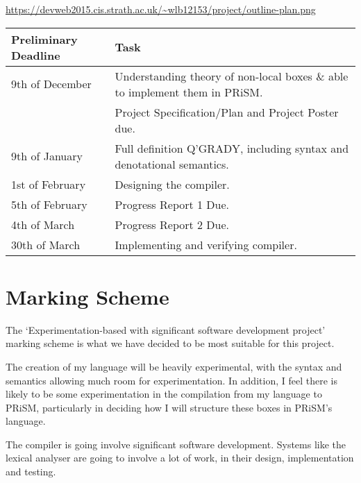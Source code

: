 \documentclass[11pt, a4paper]{article}
\begin{document}
\url{https://devweb2015.cis.strath.ac.uk/~wlb12153/project/outline-plan.png}

\begin{center}
    \begin{tabular}{l | p{7.5cm}}
        Preliminary Deadline & Task \\
        \hline
        9th of December & Understanding theory of non-local boxes \& able to
        implement them in PRiSM. \\

        & Project Specification/Plan and Project Poster due. \\

        9th of January & Full definition Q'GRADY, including syntax and
        denotational semantics. \\

        1st of February & Designing the compiler. \\

        5th of February & Progress Report 1 Due. \\

        4th of March & Progress Report 2 Due. \\

        30th of March & Implementing and verifying compiler. \\
\end{tabular}
\end{center}

\section{Marking Scheme} %
\label{sec:marking_scheme}
The `Experimentation-based with significant software development project'
marking scheme is what we have decided to be most suitable for this project.

The creation of my language will be heavily experimental, with the syntax and
semantics allowing much room for experimentation. In addition, I feel there is
likely to be some experimentation in the compilation from my language to PRiSM,
particularly in deciding how I will structure these boxes in PRiSM's language.

The compiler is going involve significant software development. Systems like the
lexical analyser are going to involve a lot of work, in their design,
implementation and testing. 

\newpage


\end{document}
